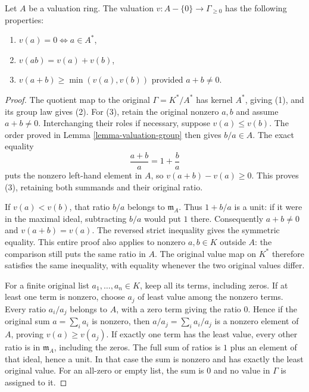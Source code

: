 \begin{lemma}
\label{lemma-properties-valuation}
Let $A$ be a valuation ring. The valuation $v : A -\{0\} \to \Gamma_{\geq 0}$
has the following properties:
\begin{enumerate}
\item $v(a) = 0 \Leftrightarrow a \in A^*$,
\item $v(ab) = v(a) + v(b)$,
\item $v(a + b) \geq \min(v(a), v(b))$ provided $a + b \not = 0$.
\end{enumerate}
\end{lemma}

\begin{proof}
The quotient map to the
original $\Gamma=K^*/A^*$
has kernel $A^*$, giving
(1), and its group law
gives (2). For (3), retain
the original nonzero $a,b$
and assume $a+b\neq0$.
Interchanging their roles
if necessary, suppose
$v(a)\leq v(b)$. The
order proved in Lemma
\ref{lemma-valuation-group}
then gives $b/a\in A$.
The exact equality
$$
\frac{a+b}{a}=1+\frac ba
$$
puts the nonzero left-hand
element in $A$, so
$v(a+b)-v(a)\geq0$.
This proves (3), retaining
both summands and their
original ratio.

If $v(a)<v(b)$, that
ratio $b/a$ belongs to
$\mathfrak m_A$. Thus
$1+b/a$ is a unit:
if it were in the maximal
ideal, subtracting $b/a$
would put $1$ there.
Consequently $a+b\neq0$
and $v(a+b)=v(a)$.
The reversed strict inequality
gives the symmetric equality.
This entire proof also
applies to nonzero $a,b\in K$
outside $A$: the comparison
still puts the same ratio
in $A$. The original value
map on $K^*$ therefore
satisfies the same inequality,
with equality whenever the
two original values differ.

For a finite original list
$a_1,\ldots,a_n\in K$, keep
all its terms, including
zeros. If at least one
term is nonzero, choose
$a_j$ of least value among
the nonzero terms. Every
ratio $a_i/a_j$ belongs
to $A$, with a zero
term giving the ratio $0$.
Hence if the original sum
$a=\sum_i a_i$ is nonzero,
then $a/a_j=\sum_i a_i/a_j$
is a nonzero element of
$A$, proving $v(a)\geq v(a_j)$.
If exactly one term has
the least value, every
other ratio is in
$\mathfrak m_A$, including
the zeros. The full sum
of ratios is $1$ plus
an element of that ideal,
hence a unit. In that
case the sum is nonzero
and has exactly the least
original value. For an
all-zero or empty list,
the sum is $0$ and no
value in $\Gamma$ is
assigned to it.
\end{proof}

